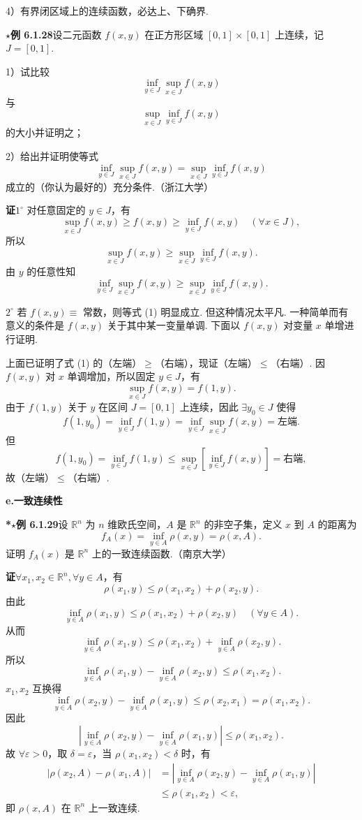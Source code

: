 \documentclass[UTF8, 12pt, fontset=fandol, oneside]{ctexart}
\begin{document}
4）有界闭区域上的连续函数，必达上、下确界.

\noindent\textbf{$\star$例 6.1.28}\quad 设二元函数 $f(x,y)$ 在正方形区域 $[0,1]\times[0,1]$ 上连续，记 $J=[0,1]$.

1）试比较
\[
  \inf_{y\in J}\sup_{x\in J}f(x,y)
\]
与
\[
  \sup_{x\in J}\inf_{y\in J}f(x,y)
\]
的大小并证明之；

2）给出并证明使等式
\[
  \inf_{y\in J}\sup_{x\in J}f(x,y)
  =\sup_{x\in J}\inf_{y\in J}f(x,y)
\tag{1}
\]
成立的（你认为最好的）充分条件.（浙江大学）

\noindent\textbf{证}\quad $1^\circ$ 对任意固定的 $y\in J$，有
\[
  \sup_{x\in J}f(x,y)\ge f(x,y)\ge \inf_{y\in J}f(x,y)
  \quad(\forall x\in J), \tag{2}
\]
所以
\[
  \sup_{x\in J}f(x,y)\ge \sup_{x\in J}\inf_{y\in J}f(x,y).
\]
由 $y$ 的任意性知
\[
  \inf_{y\in J}\sup_{x\in J}f(x,y)
  \ge \sup_{x\in J}\inf_{y\in J}f(x,y).
\]

$2^\circ$ 若 $f(x,y)\equiv$ 常数，则等式 (1) 明显成立. 但这种情况太平凡. 一种简单而有意义的条件是 $f(x,y)$ 关于其中某一变量单调. 下面以 $f(x,y)$ 对变量 $x$ 单增进行证明.

上面已证明了式 (1) 的（左端）$\ge$（右端），现证（左端）$\le$（右端）. 因 $f(x,y)$ 对 $x$ 单调增加，所以固定 $y\in J$，有
\[
  \sup_{x\in J}f(x,y)=f(1,y).
\]
由于 $f(1,y)$ 关于 $y$ 在区间 $J=[0,1]$ 上连续，因此 $\exists y_0\in J$ 使得
\[
  f(1,y_0)=\inf_{y\in J}f(1,y)
  =\inf_{y\in J}\sup_{x\in J}f(x,y)=\text{左端}.
\]
但
\[
  f(1,y_0)=\inf_{y\in J}f(1,y)
  \le \sup_{x\in J}\left[\inf_{y\in J}f(x,y)\right]
  =\text{右端},
\]
故（左端）$\le$（右端）.

\noindent\textbf{e.\quad 一致连续性}

\noindent\textbf{*$\star$例 6.1.29}\quad 设 $\mathbb{R}^n$ 为 $n$ 维欧氏空间，$A$ 是 $\mathbb{R}^n$ 的非空子集，定义 $x$ 到 $A$ 的距离为
\[
  f_A(x)=\inf_{y\in A}\rho(x,y)=\rho(x,A).
\]
证明 $f_A(x)$ 是 $\mathbb{R}^n$ 上的一致连续函数.（南京大学）

\noindent\textbf{证}\quad $\forall x_1,x_2\in\mathbb{R}^n,\forall y\in A$，有
\[
  \rho(x_1,y)\le \rho(x_1,x_2)+\rho(x_2,y).
\]
由此
\[
  \inf_{y\in A}\rho(x_1,y)\le \rho(x_1,x_2)+\rho(x_2,y)
  \quad(\forall y\in A).
\]
从而
\[
  \inf_{y\in A}\rho(x_1,y)\le \rho(x_1,x_2)+\inf_{y\in A}\rho(x_2,y).
\]
所以
\[
  \inf_{y\in A}\rho(x_1,y)-\inf_{y\in A}\rho(x_2,y)\le \rho(x_1,x_2).
\]
$x_1,x_2$ 互换得
\[
  \inf_{y\in A}\rho(x_2,y)-\inf_{y\in A}\rho(x_1,y)\le \rho(x_2,x_1)=\rho(x_1,x_2).
\]
因此
\[
  \left|\inf_{y\in A}\rho(x_2,y)-\inf_{y\in A}\rho(x_1,y)\right|\le \rho(x_1,x_2).
\]
故 $\forall\varepsilon>0$，取 $\delta=\varepsilon$，当 $\rho(x_1,x_2)<\delta$ 时，有
\[
\begin{aligned}
|\rho(x_2,A)-\rho(x_1,A)|
&=\left|\inf_{y\in A}\rho(x_2,y)-\inf_{y\in A}\rho(x_1,y)\right|\\
&\le \rho(x_1,x_2)<\varepsilon,
\end{aligned}
\]
即 $\rho(x,A)$ 在 $\mathbb{R}^n$ 上一致连续.
\end{document}

